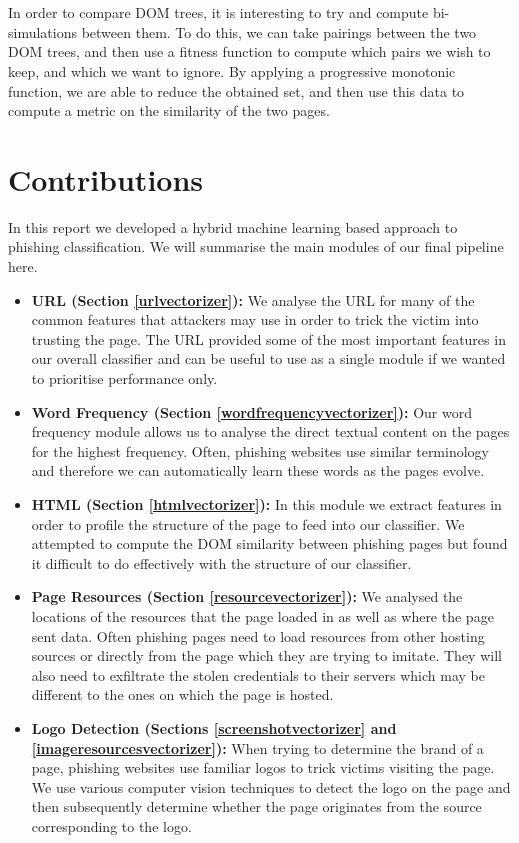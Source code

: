 \documentclass[12pt,twoside]{report}
\begin{document}
\\\\
In order to compare DOM trees, it is interesting to try and compute bi-simulations between them. To do this, we can take pairings between the two DOM trees, and then use a fitness function to compute which pairs we wish to keep, and which we want to ignore. By applying a progressive monotonic function, we are able to reduce the obtained set, and then use this data to compute a metric on the similarity of the two pages.
\section{Contributions}
In this report we developed a hybrid machine learning based approach to phishing classification. We will summarise the main modules of our final pipeline here.
\begin{itemize}
    \item \textbf{URL (Section \ref{urlvectorizer}): }We analyse the URL for many of the common features that attackers may use in order to trick the victim into trusting the page. The URL provided some of the most important features in our overall classifier and can be useful to use as a single module if we wanted to prioritise performance only.
    \item \textbf{Word Frequency (Section \ref{wordfrequencyvectorizer}): }Our word frequency module allows us to analyse the direct textual content on the pages for the highest frequency. Often, phishing websites use similar terminology and therefore we can automatically learn these words as the pages evolve.
    \item \textbf{HTML (Section \ref{htmlvectorizer}): }In this module we extract features in order to profile the structure of the page to feed into our classifier. We attempted to compute the DOM similarity between phishing pages but found it difficult to do effectively with the structure of our classifier.
    \item \textbf{Page Resources (Section \ref{resourcevectorizer}): }We analysed the locations of the resources that the page loaded in as well as where the page sent data. Often phishing pages need to load resources from other hosting sources or directly from the page which they are trying to imitate. They will also need to exfiltrate the stolen credentials to their servers which may be different to the ones on which the page is hosted.
    \item \textbf{Logo Detection (Sections \ref{screenshotvectorizer} and \ref{imageresourcesvectorizer}): }When trying to determine the brand of a page, phishing websites use familiar logos to trick victims visiting the page. We use various computer vision techniques to detect the logo on the page and then subsequently determine whether the page originates from the source corresponding to the logo.
\end{itemize}
\end{document}
